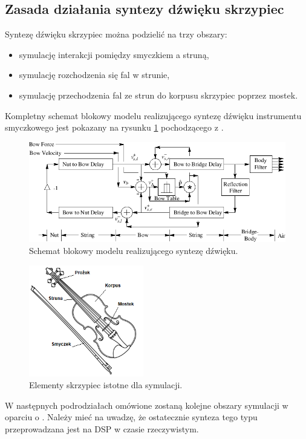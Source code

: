 \subsection{Zasada działania syntezy dźwięku skrzypiec}
Syntezę dźwięku skrzypiec można podzielić na trzy obszary:
\begin{itemize}
	\setlength\itemsep{-3pt}
	\item symulację interakcji pomiędzy smyczkiem a struną,
	\item symulację rozchodzenia się fal w strunie,
	\item symulację przechodzenia fal ze strun do korpusu skrzypiec poprzez mostek.
\end{itemize}
Kompletny schemat blokowy modelu realizującego syntezę dźwięku instrumentu smyczkowego jest pokazany na rysunku \ref{rys:schematblokowy} pochodzącego z \cite{bowed_3}.
\begin{figure}[H]
	\centering
	\includegraphics[width=12cm]{grafiki/schematblokowy}
	\captionsetup{justification=centering}
	\caption{Schemat blokowy modelu realizującego syntezę dźwięku.}
	\label{rys:schematblokowy}
\end{figure}

\begin{figure}[H]
	\centering
	\includegraphics[width=5cm]{grafiki/skrzypce}
	\captionsetup{justification=centering}
	\caption{Elementy skrzypiec istotne dla symulacji.}
	\label{rys:skrzypce}
\end{figure}

W następnych podrodziałach omówione zostaną kolejne obszary symulacji w oparciu o \cite{bowed_smith}. Należy mieć na uwadzę, że ostatecznie synteza tego typu przeprowadzana jest na DSP w czasie rzeczywistym.


